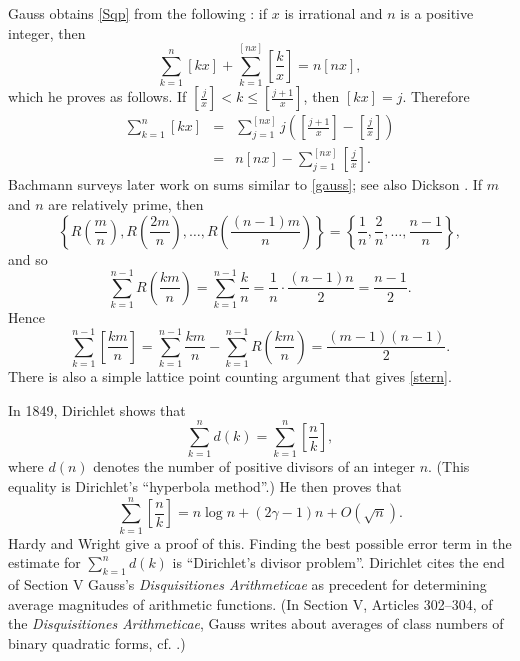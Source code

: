 \documentclass{amsart}
\begin{document}
Gauss obtains \eqref{Sqp} from the following \cite[p.~116, \S 5]{smith}:
if $x$ is irrational and $n$ is a positive integer, then
\begin{equation}
\sum_{k=1}^n [kx]+\sum_{k=1}^{[nx]} \left[ \frac{k}{x} \right]=n[nx],
\label{gauss}
\end{equation}
which he proves as follows.
If $\left[\frac{j}{x}\right] < k \leq \left[\frac{j+1}{x}\right]$, then $[kx]=j$. Therefore
\begin{eqnarray*}
\sum_{k=1}^n [kx]&=&\sum_{j=1}^{[nx]} j \left( \left[\frac{j+1}{x} \right]- \left[\frac{j}{x} \right] \right)\\
&=&n[nx]-\sum_{j=1}^{[nx]}  \left[\frac{j}{x} \right].
\end{eqnarray*}
Bachmann \cite[pp.~654--658, \S 4]{bachmann1904} surveys later work on sums similar to \eqref{gauss}; see also Dickson \cite[Chapter X]{dicksonI}.
If $m$ and $n$ are relatively prime, then
\[
\left\{R\left(\frac{m}{n}\right), R\left(\frac{2m}{n}\right), \ldots, R\left(\frac{(n-1)m}{n}\right)\right\} =\left\{\frac{1}{n},\frac{2}{n},\ldots,\frac{n-1}{n}\right\},
\]
and so
\[
\sum_{k=1}^{n-1} R\left( \frac{km}{n} \right)=\sum_{k=1}^{n-1} \frac{k}{n}=\frac{1}{n} \cdot \frac{(n-1)n}{2}=\frac{n-1}{2}.
\]
Hence
\begin{equation}
\sum_{k=1}^{n-1} \left[ \frac{km}{n} \right] = \sum_{k=1}^{n-1} \frac{km}{n} - \sum_{k=1}^{n-1} R\left( \frac{km}{n} \right)=\frac{(m-1)(n-1)}{2}.
\label{stern}
\end{equation}
There is also a simple lattice point counting argument \cite[p.~113, No.~18]{polyaII} that gives \eqref{stern}.

In 1849, Dirichlet \cite{mittleren} shows that 
\[
\sum_{k=1}^n d(k) = \sum_{k=1}^n \left[  \frac{n}{k} \right],
\]
where $d(n)$ denotes the number of positive divisors of an integer $n$. (This equality is Dirichlet's ``hyperbola method''.) He then proves that
\[
\sum_{k=1}^n \left[  \frac{n}{k} \right] = n \log n + (2\gamma -1)n +O(\sqrt{n}).
\]
Hardy and Wright \cite[pp.~264--265, Theorem 320]{wright} give a proof of this.
Finding the best possible error term in the estimate for $\sum_{k=1}^n d(k)$ is ``Dirichlet's divisor problem''.  Dirichlet cites  
the end of Section V Gauss's {\em Disquisitiones Arithmeticae}
as precedent for determining average magnitudes of arithmetic functions. (In Section V, Articles 302--304, of the {\em Disquisitiones Arithmeticae},
Gauss writes about averages of class numbers of binary quadratic forms, cf. \cite[Chapter VI]{dicksonIII}.)
\end{document}
